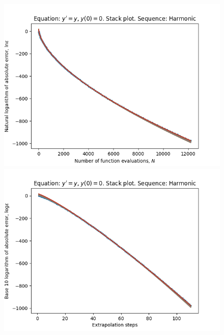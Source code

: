 \begin{figure}[H]
\centering
\begin{minipage}{0.45\textwidth}
\centering
\includegraphics[scale=0.45]{emr_plots/exp_growth_hp_harmonic_stack.png}
\end{minipage}
\begin{minipage}{0.45\textwidth}
\centering
\includegraphics[scale=0.45]{emr_plots/exp_growth_hp_harmonic_steps_stack.png}
\end{minipage}
\end{figure}

